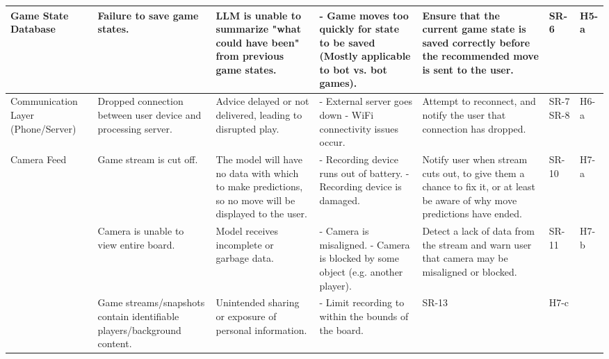 \documentclass{article}
\begin{document}
\begin{landscape}
\begin{tabularx}{\linewidth}{|P{2.5cm}|Y|Y|Y|Y|P{1cm}|P{1cm}|}
        \hline

        Game State Database &
        Failure to save game states. &
        LLM is unable to summarize "what could have been" from previous game states. &
        - Game moves too quickly for state to be saved (Mostly applicable to bot vs. bot games). &
        Ensure that the current game state is saved correctly before the recommended move is sent to the user. &
        SR-6 &
        H5-a \\

        \hline

        Communication Layer (Phone/Server) &
        Dropped connection between user device and processing server. &
        Advice delayed or not delivered, leading to disrupted play. &
        - External server goes down \newline - WiFi connectivity issues occur. &
        Attempt to reconnect, and notify the user that connection has dropped. &
        SR-7 \newline SR-8 &
        H6-a \\

        \hline

        Camera Feed &
        Game stream is cut off. &
        The model will have no data with which to make predictions, so no move will be displayed to the user. &
        - Recording device runs out of battery. \newline - Recording device is damaged. &
        Notify user when stream cuts out, to give them a chance to fix it, or at least be aware of why move predictions have ended. &
        SR-10 &
        H7-a \\

        &
        Camera is unable to view entire board. &
        Model receives incomplete or garbage data. &
        - Camera is misaligned. \newline - Camera is blocked by some object (e.g. another player). &
        Detect a lack of data from the stream and warn user that camera may be misaligned or blocked. &
        SR-11 &
        H7-b \\

        &
        Game streams/snapshots contain identifiable players/background content.
        &
        Unintended sharing or exposure of personal information. &
        - Limit recording to within the bounds of the board. &
        SR-13 &
        H7-c \\

    \end{tabularx}
\end{landscape}
\end{document}
